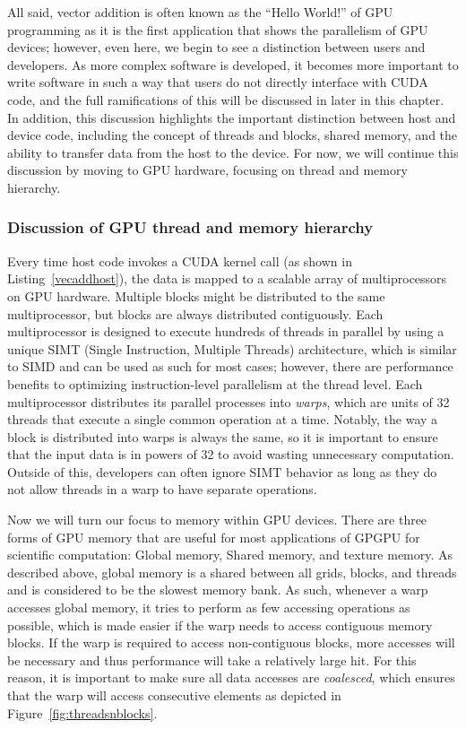 All said, vector addition is often known as the ``Hello World!'' of GPU programming as it is the first application that shows the parallelism of GPU devices; however, even here, we begin to see a distinction between users and developers.
As more complex software is developed, it becomes more important to write software in such a way that users do not directly interface with CUDA code, and the full ramifications of this will be discussed in later in this chapter.
In addition, this discussion highlights the important distinction between host and device code, including the concept of threads and blocks, shared memory, and the ability to transfer data from the host to the device.
For now, we will continue this discussion by moving to GPU hardware, focusing on thread and memory hierarchy.

\subsubsection{Discussion of GPU thread and memory hierarchy}

Every time host code invokes a CUDA kernel call (as shown in Listing~\ref{vecaddhost}), the data is mapped to a scalable array of multiprocessors on GPU hardware.
Multiple blocks might be distributed to the same multiprocessor, but blocks are always distributed contiguously.
Each multiprocessor is designed to execute hundreds of threads in parallel by using a unique SIMT (Single Instruction, Multiple Threads) architecture, which is similar to SIMD and can be used as such for most cases; however, there are performance benefits to optimizing instruction-level parallelism at the thread level.
Each multiprocessor distributes its parallel processes into \textit{warps}, which are units of 32 threads that execute a single common operation at a time.
Notably, the way a block is distributed into warps is always the same, so it is important to ensure that the input data is in powers of 32 to avoid wasting unnecessary computation.
Outside of this, developers can often ignore SIMT behavior as long as they do not allow threads in a warp to have separate operations.

Now we will turn our focus to memory within GPU devices.
There are three forms of GPU memory that are useful for most applications of GPGPU for scientific computation: Global memory, Shared memory, and texture memory.
As described above, global memory is a shared between all grids, blocks, and threads and is considered to be the slowest memory bank.
As such, whenever a warp accesses global memory, it tries to perform as few accessing operations as possible, which is made easier if the warp needs to access contiguous memory blocks.
If the warp is required to access non-contiguous blocks, more accesses will be necessary and thus performance will take a relatively large hit.
For this reason, it is important to make sure all data accesses are \textit{coalesced}, which ensures that the warp will access consecutive elements as depicted in Figure~\ref{fig:threadsnblocks}.

